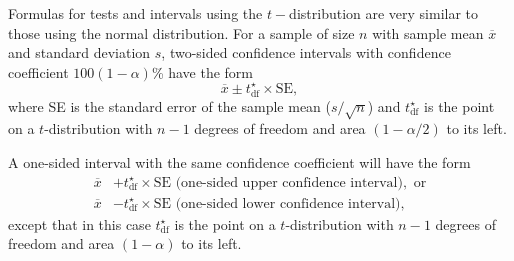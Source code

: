 Formulas for tests and intervals using the $t-$distribution are very similar to those using the normal distribution.  For a sample of size $n$ with sample mean $\overline{x}$ and standard deviation $s$, two-sided confidence intervals with confidence coefficient $100(1 - \alpha)$\% have the form
\[
    \overline{x} \pm t_{\text{df}}^{\star} \times \text{SE},
\]
where SE is the standard error of the sample mean ($s/\sqrt{n}$) and $t_{\text{df}}^{\star}$ is the point on a $t$-distribution with $n-1$ degrees of freedom and area $(1 - \alpha/2)$ to its left.

A one-sided interval with the same confidence coefficient will have the form  
\begin{align*}
    \overline{x} &+ t_{\text{df}}^{\star} \times \text{SE} \text{   (one-sided upper confidence interval)}, \text{  or} \\
    \overline{x} &- t_{\text{df}}^{\star} \times \text{SE} \text{   (one-sided lower confidence interval)},
\end{align*}
except that in this case $t_{\text{df}}^{\star}$ is the point on a $t$-distribution with $n-1$ degrees of freedom and  area $(1 - \alpha)$ to its left.


